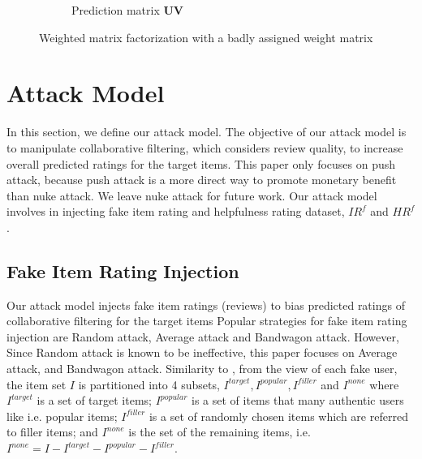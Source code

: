 \documentclass[master,english,final]{kaist-ucs}
\begin{document}
\begin{figure}[h]
\begin{subfigure}[b]{0.3\textwidth}
        \caption{Prediction matrix $\bm{UV}$}
        \label{wmf_bad_prediction}
    \end{subfigure}
    \caption{Weighted matrix factorization with a badly assigned weight matrix}
    \label{wmf_bad}
\end{figure}


\section{Attack Model}
In this section, we define our attack model.
The objective of our attack model is to manipulate collaborative filtering, which considers review quality, to increase overall predicted ratings for the target items.
This paper only focuses on push attack, because push attack is a more direct way to promote monetary benefit than nuke attack.
We leave nuke attack for future work.
Our attack model involves in injecting fake item rating and helpfulness rating dataset, $IR^f$ and $HR^f$.

\subsection{Fake Item Rating Injection}
Our attack model injects fake item ratings (reviews) to bias predicted ratings of collaborative filtering for the target items
Popular strategies for fake item rating injection are Random attack, Average attack and Bandwagon attack.
However, Since Random attack is known to be ineffective, this paper focuses on Average attack, and Bandwagon attack.
Similarity to \cite{shilling_attack_guide}, from the view of each fake user, the item set $I$ is partitioned into 4 subsets, $I^{target},I^{popular},I^{filler}$  and $I^{none}$ where $I^{target}$ is a set of target items; $I^{popular}$ is a set of items that many authentic users like i.e. popular items; $I^{filler}$ is a set of randomly chosen items which are referred to filler items; and $I^{none}$ is the set of the remaining items, i.e. $I^{none}=I-I^{target}-I^{popular}-I^{filler}$.
\end{document}
